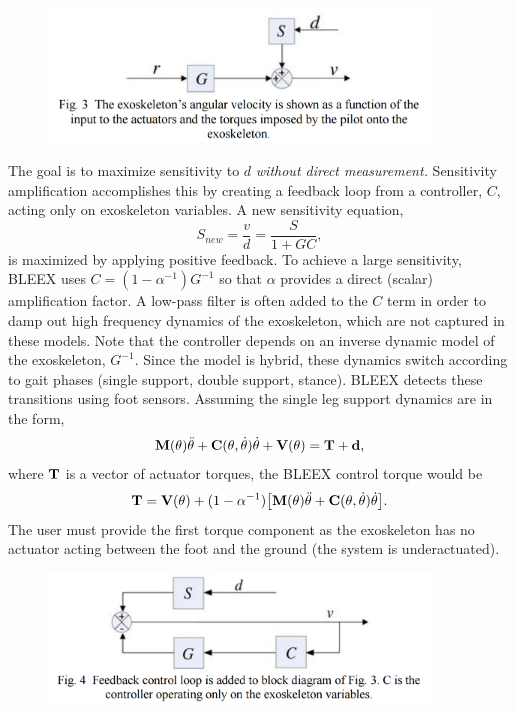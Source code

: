 \begin{refsection}
\begin{figure}[ht]
  \centering
  \includegraphics[width=4.0in]{exos/figs/bleex_control_diag_1.png}
\end{figure}

The goal is to maximize sensitivity to $d$ \emph{without direct measurement.}  Sensitivity amplification accomplishes this by creating a feedback loop from a controller, $C$, acting only on exoskeleton variables.  A new sensitivity equation,
\[S_{new} = \frac{v}{d} = \frac{S}{1 + G C} ,\]
is maximized by applying positive feedback.  To achieve a large sensitivity, BLEEX uses $C = (1-\alpha^{-1})G^{-1}$ so that $\alpha$ provides a direct (scalar) amplification factor. A low-pass filter is often added to the $C$ term in order to damp out high frequency dynamics of the exoskeleton, which are not captured in these models.  Note that the controller depends on an inverse dynamic model of the exoskeleton, $G^{-1}$.  Since the model is hybrid, these dynamics switch according to gait phases (single support, double support, stance).  BLEEX detects these transitions using foot sensors.  Assuming the single leg support dynamics are in the form,
\begin{equation}
{\bf M}({\bf\theta})\ddot{{\bf \theta}} + {\bf C}({\bf\theta},\dot{{\bf\theta}}) \dot{{\bf \theta}} + {\bf V}({\bf\theta}) = {\bf T} + {\bf d} ,
\end{equation}
where ${\bf T}$ is a vector of actuator torques, the BLEEX control torque would be
\begin{equation}
{\bf T} = {\bf V}({\bf\theta}) + (1 - \alpha^{-1}) \big [ {\bf M}({\bf\theta})\ddot{{\bf \theta}} + {\bf C}({\bf\theta},\dot{{\bf\theta}}) \dot{{\bf \theta}} \big ] .
\end{equation}
The user must provide the first torque component as the exoskeleton has no actuator acting between the foot and the ground (the system is underactuated).

\begin{figure}[ht]
  \centering
  \includegraphics[width=4.0in]{exos/figs/bleex_control_diag_2.png}
\end{figure}


\end{refsection}
